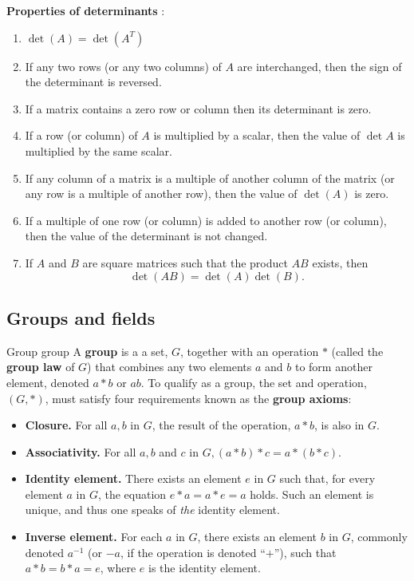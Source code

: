 \textbf{Properties of determinants} \cite{math1141_notes}:
\begin{enumerate}
	\item $\det (A) = \det (A^T)$
	\item If any two rows (or any two columns) of $A$ are interchanged, then the sign of the determinant is reversed.
	\item If a matrix contains a zero row or column then its determinant is zero.
	\item If a row (or column) of $A$ is multiplied by a scalar, then the value of $\det A$ is multiplied by the same scalar.
	\item If any column of a matrix is a multiple of another column of the matrix (or any row is a multiple of another row), then the value of $\det (A)$ is zero.
	\item If a multiple of one row (or column) is added to another row (or column), then the value of the determinant is not changed.
	\item If $A$ and $B$ are square matrices such that the product $AB$ exists, then
$$ \det (AB) = \det (A) \det (B) . $$
\end{enumerate}

\subsection{Groups and fields}

\begin{definition}{Group \cite{math2601_notes}}{group}
A \textbf{group} is a a set, $G$, together with an operation $*$ (called the \textbf{group law} of $G$) that combines any two elements $a$ and $b$ to form another element, denoted $a * b$ or $ab$. To qualify as a group, the set and operation, $(G, *)$, must satisfy four requirements known as the \textbf{group axioms}:
\begin{itemize}
 	\item \textbf{Closure.} For all $a, b$ in $G$, the result of the operation, $a * b$, is also in $G$.
 	\item \textbf{Associativity.} For all $a, b$ and $c$ in $G, (a * b) * c = a * (b * c)$.
 	\item \textbf{Identity element.} There exists an element $e$ in $G$ such that, for every element $a$ in $G$, the equation $e * a = a * e = a$ holds. Such an element is unique, and thus one speaks of \textit{the} identity element.
 	\item \textbf{Inverse element.} For each $a$ in $G$, there exists an element $b$ in $G$, commonly denoted $a^{-1}$ (or $-a$, if the operation is denoted ``$+$''), such that $a * b = b * a = e$, where $e$ is the identity element.
\end{itemize}
\end{definition}

